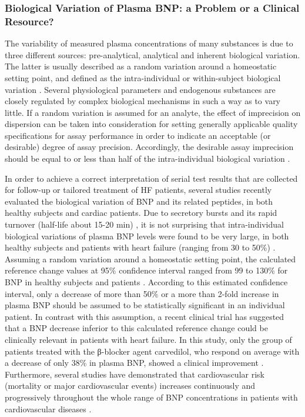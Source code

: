 \documentclass[14pt,a4paper,onecolumn]{extarticle}
\begin{document}
\subsubsection{ Biological Variation of Plasma BNP: a Problem or a Clinical Resource?}

The variability of measured plasma concentrations of many substances is due to three
different sources: pre-analytical, analytical and inherent biological variation. The latter is
usually described as a random variation around a homeostatic setting point, and defined
as the intra-individual or within-subject biological variation \citep{bib395}. Several physiological
parameters and endogenous substances are closely regulated by complex biological mechanisms in such a way as to vary little. If a random variation is assumed for an analyte,
the effect of imprecision on dispersion can be taken into consideration for setting generally
applicable quality specifications for assay performance in order to indicate an acceptable
(or desirable) degree of assay precision. Accordingly, the desirable assay imprecision
should be equal to or less than half of the intra-individual biological variation \citep{bib396} \citep{bib397}.

In order to achieve a correct interpretation of serial test results that are collected for
follow-up or tailored treatment of HF patients, several studies \citep{bib397} \citep{bib398} \citep{bib399} \citep{bib3100} \citep{bib3101} recently evaluated the biological variation of BNP and its related peptides, in both healthy subjects and
cardiac patients.
Due to secretory bursts and its rapid turnover (half-life about 15-20 min) \citep{bib31} \citep{bib3102}
, it is not surprising that intra-individual
biological variations of plasma BNP levels were found to be very large, in both healthy
subjects and patients with heart failure (ranging from 30 to 50\%) \citep{bib397} \citep{bib399} \citep{bib3100} \citep{bib3101}. Assuming a random variation around a homeostatic setting point, the calculated reference
change values at 95\% confidence interval ranged from 99 to 130\% for BNP in healthy subjects and patients \citep{bib397} \citep{bib399} \citep{bib3100} \citep{bib3101}. According to this estimated confidence interval, only a
decrease of more than 50\% or a more than 2-fold increase in plasma BNP should be
assumed to be statistically significant in an individual patient.
In contrast with this assumption, a recent clinical trial \citep{bib390} has suggested that a
BNP decrease inferior to this calculated reference change could be clinically relevant
in patients with heart failure. In this study, only the group of patients treated with the
β-blocker agent carvedilol, who respond on average with a decrease of only 38\% in
plasma BNP, showed a clinical improvement \citep{bib390}. Furthermore, several studies have
demonstrated that cardiovascular risk (mortality or major cardiovascular events)
increases continuously and progressively throughout the whole range of BNP concentrations in patients with cardiovascular diseases \citep{bib35} \citep{bib377} \citep{bib378} \citep{bib379}.
\end{document}
